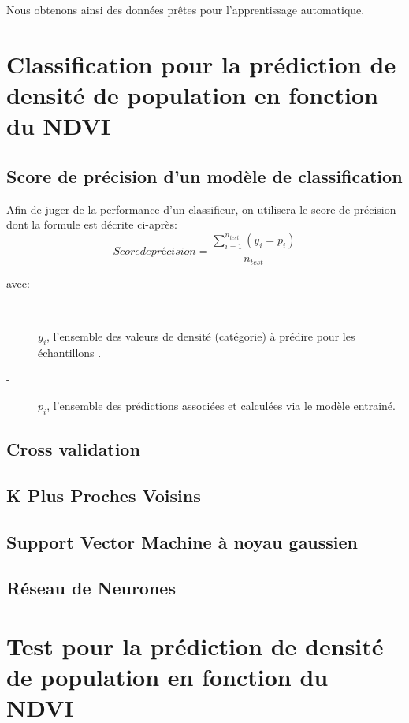 \documentclass{book}
\begin{document}
Nous obtenons ainsi des données prêtes pour l'apprentissage automatique.


\chapter{Classification pour la prédiction de densité de population en fonction du NDVI}
 
\section{Score de précision d'un modèle de classification}

Afin de juger de la performance d'un classifieur, on utilisera le score de précision dont la formule est décrite ci-après:\\

\begin{equation}
Score de précision = \frac{\sum \limits_{\underset{}{i=1}}^{n_{test}} (y_i = p_i)}{n_{test}}
\end{equation}

avec:
\begin{description}
\item[-] ${y_i}$, l'ensemble des valeurs de densité (catégorie) à prédire pour les échantillons .
\item[-] ${p_i}$, l'ensemble des prédictions associées et calculées via le modèle entrainé.
\end{description}

\section{Cross validation}

\section{K Plus Proches Voisins}

\section{Support Vector Machine à noyau gaussien}

\section{Réseau de Neurones}


\chapter{Test pour la prédiction de densité de population en fonction du NDVI}
\end{document}
